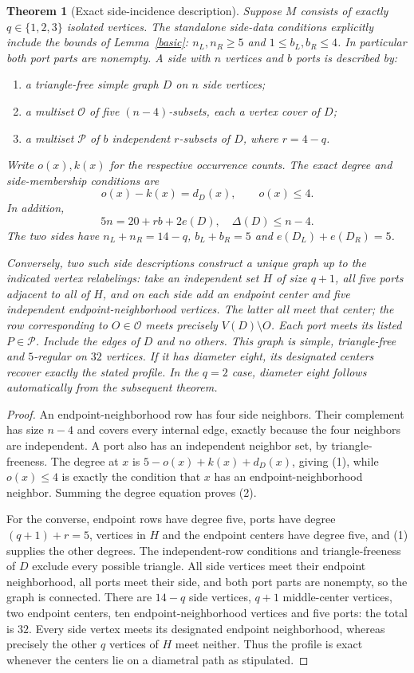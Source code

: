 \documentclass[11pt]{article}
\newtheorem{theorem}{Theorem}
\begin{document}
\begin{theorem}[Exact side-incidence description]\label{hyper}
Suppose $M$ consists of exactly $q\in\{1,2,3\}$ isolated vertices.
The standalone side-data conditions explicitly include the bounds of
Lemma~\ref{basic}: $n_L,n_R\geq5$ and $1\leq b_L,b_R\leq4$.
In particular both port parts are nonempty.
A side with $n$ vertices and $b$ ports is described by:
\begin{enumerate}
\item a triangle-free simple graph $D$ on $n$ side vertices;
\item a multiset $\mathcal O$ of five $(n-4)$-subsets, each a
vertex cover of $D$;
\item a multiset $\mathcal P$ of $b$ independent $r$-subsets of $D$,
where $r=4-q$.
\end{enumerate}
Write $o(x),k(x)$ for the respective occurrence counts. The exact
degree and side-membership conditions are
\[
 o(x)-k(x)=d_D(x),\qquad o(x)\leq4.                 \tag{1}
\]
In addition,
\[
 5n=20+rb+2e(D),\quad \Delta(D)\leq n-4.           \tag{2}
\]
The two sides have $n_L+n_R=14-q$, $b_L+b_R=5$ and
$e(D_L)+e(D_R)=5$.

Conversely, two such side descriptions construct a unique graph up to
the indicated vertex relabelings: take an independent set $H$ of size
$q+1$, all five ports adjacent to all of $H$, and on each side add an
endpoint center and five independent endpoint-neighborhood vertices.
The latter all meet that center; the row corresponding to $O\in
\mathcal O$ meets precisely $V(D)\setminus O$. Each port meets its
listed $P\in\mathcal P$. Include the edges of $D$ and no others.
This graph is simple, triangle-free and $5$-regular on $32$ vertices.
If it has diameter eight, its designated centers recover exactly the
stated profile. In the $q=2$ case, diameter eight follows automatically
from the subsequent theorem.
\end{theorem}
\begin{proof}
An endpoint-neighborhood row has four side neighbors. Their complement
has size $n-4$ and covers every internal edge, exactly because the four
neighbors are independent. A port also has an independent neighbor set,
by triangle-freeness. The degree at $x$ is
$5-o(x)+k(x)+d_D(x)$, giving (1), while $o(x)\leq4$ is exactly the
condition that $x$ has an endpoint-neighborhood neighbor. Summing the
degree equation proves (2).

For the converse, endpoint rows have degree five, ports have degree
$(q+1)+r=5$, vertices in $H$ and the endpoint centers have degree five,
and (1) supplies the other degrees. The independent-row conditions and
triangle-freeness of $D$ exclude every possible triangle. All side
vertices meet their endpoint neighborhood, all ports meet their side,
and both port parts are nonempty, so the graph is connected.
There are $14-q$ side vertices, $q+1$ middle-center vertices, two
endpoint centers, ten endpoint-neighborhood vertices and five ports:
the total is $32$. Every side vertex meets its designated endpoint
neighborhood, whereas precisely the other $q$ vertices of $H$ meet
neither. Thus the profile is exact whenever the centers lie on a
diametral path as stipulated.
\end{proof}
\end{document}
